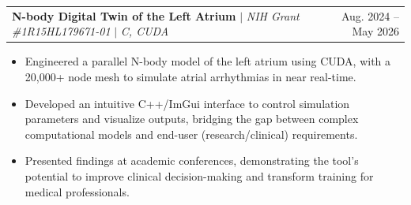\documentclass[letterpaper,11pt]{article}
\makeatletter
\newcommand{\resumeItem}[1]{
  \item\small{
    {#1 \vspace{-2pt}}
  }
}
\newcommand{\resumeProjectHeading}[2]{
    \item
    \begin{tabular*}{0.97\textwidth}{l@{\extracolsep{\fill}}r}
      \small#1 & #2 \\
    \end{tabular*}\vspace{-7pt}
}
\newcommand{\resumeItemListStart}{\begin{itemize}}
\newcommand{\resumeItemListEnd}{\end{itemize}\vspace{-5pt}}
\makeatother
\begin{document}
    \resumeProjectHeading
  			{\textbf{N-body Digital Twin of the Left Atrium} $|$ \emph{NIH Grant \#1R15HL179671-01} $|$ \emph{C, CUDA }}{Aug. 2024 -- May 2026}
         \resumeItemListStart
				\resumeItem{Engineered a parallel N-body model of the left atrium using CUDA, with a 20,000+ node mesh to simulate atrial arrhythmias in near real-time.}
				\resumeItem{Developed an intuitive C++/ImGui interface to control simulation parameters and visualize outputs, bridging the gap between complex computational models and end-user (research/clinical) requirements.}
				\resumeItem{Presented findings at academic conferences, demonstrating the tool's potential to improve clinical decision-making and transform training for medical professionals.}
         \resumeItemListEnd
           \vspace{-2pt}
          

          
\end{document}
